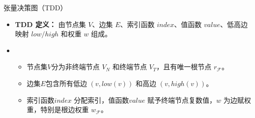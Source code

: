 \documentclass[aspectratio=1610]{ctexbeamer}
\begin{document}
\begin{frame}{张量决策图（TDD）}
    \begin{itemize}
        \item \textbf{TDD 定义：} 由节点集 $V$、边集 $E$、索引函数 $index$、值函数 $value$、低高边映射 $low/high$ 和权重 $w$ 组成。
        \item
        \begin{itemize}
            \item 节点集$V$分为非终端节点 $V_N$ 和终端节点 $V_T$，且有唯一根节点 $r_{\mathcal{F}}$。
            \item 边集$E$包含所有低边 $\left(v,low(v)\right)$ 和高边 $\left(v,high(v)\right)$。
            \item 索引函数$index$ 分配索引，值函数$value$ 赋予终端节点复数值，$w$ 为边赋权重，特别是根边权重 $w_{\mathcal{F}}$。
        \end{itemize}
    \end{itemize}
\end{frame}
\end{document}
